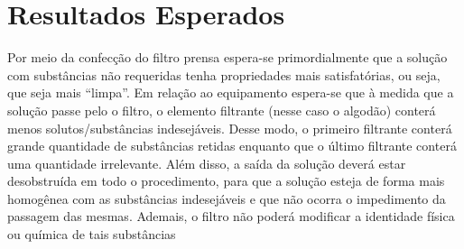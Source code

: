 \chapter{Resultados Esperados}
\label{chap:resultados}

Por meio da confecção do filtro prensa espera-se primordialmente que a solução
com substâncias não requeridas tenha propriedades mais satisfatórias, ou seja,
que seja mais ``limpa''. Em relação ao equipamento espera-se que à medida que a
solução passe pelo o filtro, o elemento filtrante (nesse caso o algodão) conterá
menos solutos/substâncias indesejáveis. Desse modo, o primeiro filtrante conterá
grande quantidade de substâncias retidas enquanto que o último filtrante conterá
uma quantidade irrelevante. Além disso, a saída da solução deverá estar
desobstruída em todo o procedimento, para que a solução esteja de forma mais
homogênea com as substâncias indesejáveis e que não ocorra o impedimento da
passagem das mesmas. Ademais, o filtro não poderá modificar a identidade física
ou química de tais substâncias

